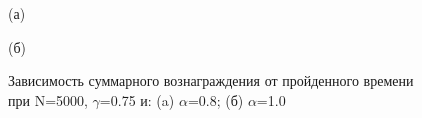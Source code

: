 \documentclass[a4paper]{report}
\theoremstyle{definition}
\theoremstyle{plain}
\theoremstyle{remark}
\theoremstyle{remark}
\theoremstyle{definition}
\begin{document}
\begin{figure}[H]
    \begin{minipage}[H]{0.49\linewidth}
        (а)\\
    \end{minipage}
    \hfill
    \begin{minipage}[H]{0.49\linewidth}
        (б)\\
    \end{minipage}
    \caption{Зависимость суммарного вознаграждения от пройденного времени при N=5000, $\gamma$=0.75 и: (a) $\alpha$=0.8; (б) $\alpha$=1.0}
\end{figure}
\end{document}
